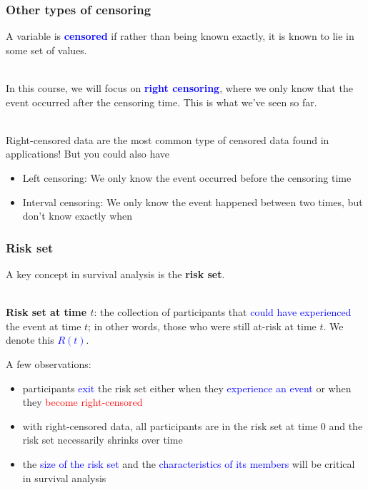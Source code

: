 \documentclass[10pt,t]{beamer}
\begin{document}
\begin{frame}
\frametitle{Other types of censoring}
A variable is \textcolor{blue}{\textbf{censored}} if rather than being known exactly, it is known to lie in some set of values.
\\ ~\ 

In this course, we will focus on \textcolor{blue}{\textbf{right censoring}}, where we only know that the event occurred after the censoring time. This is what we've seen so far. 
\\ ~\ 

Right-censored data are the most common type of censored data found in applications! But you could also have 

\medskip
 
\begin{itemize}
	\item Left censoring: We only know the event occurred before the censoring time  
	
	\medskip
	
	\item Interval censoring: We only know the event happened between two times, but don't know exactly when
\end{itemize}
\end{frame}

\begin{frame}
\frametitle{Risk set}

\vspace{-5 mm}

A key concept in survival analysis is the \textbf{risk set}.
\\ ~\ 

\textbf{Risk set at time $t$}: the collection of participants that \textcolor{blue}{could have experienced} the event at time $t$; in other words, those who were still at-risk at time $t$. We denote this \textcolor{blue}{$R(t)$}. 
\bigskip

A few observations:
\medskip

\begin{itemize}
\item participants \textcolor{blue}{exit} the risk set either when they \textcolor{blue}{experience an event} or when they \textcolor{red}{become right-censored}

\medskip

\item with right-censored data, all participants are in the risk set at time 0 and the risk set necessarily shrinks over time

\medskip

\item the \textcolor{blue}{size of the risk set} and the \textcolor{blue}{characteristics of its members} will be critical in survival analysis
\end{itemize}
\end{frame}
\end{document}

